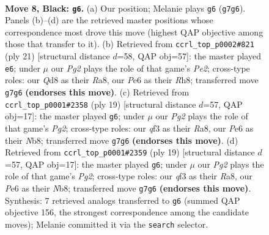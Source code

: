 \documentclass[11pt]{article}
\begin{document}
\begin{figure}[p]\centering
\begin{subfigure}{0.46\textwidth}\centering
\resizebox{\linewidth}{!}{%
\newchessgame
\chessboard[
  setfen={rn1qkb1r/pp3ppp/4pn2/3p4/3P2P1/2N2Q1P/PPP2P2/R1B1KB1R b KQkq - 0 8},
  showmover=false,
  pgfstyle=straightmove, color=movearrow, markmove={g7-g6}
]}
\caption{}
\end{subfigure}\hfill
\begin{subfigure}{0.46\textwidth}\centering
\resizebox{\linewidth}{!}{%
\newchessgame
\chessboard[
  setfen={r3kb1r/ppq1pppp/1np2n2/4N3/3P4/5QP1/PP2PP1P/R1B1KB1R b KQkq - 2 11},
  showmover=false,
  pgfstyle=straightmove, color=movearrow, markmove={e7-e6}
]}
\caption{}
\end{subfigure}
\\[4pt]
\begin{subfigure}{0.46\textwidth}\centering
\resizebox{\linewidth}{!}{%
\newchessgame
\chessboard[
  setfen={rn1qkb1r/1p3pp1/p2p1n2/3Pp2p/8/1N2BP2/PPP3PP/R2QKB1R b KQkq - 0 10},
  showmover=false,
  pgfstyle=straightmove, color=movearrow, markmove={g7-g6}
]}
\caption{}
\end{subfigure}\hfill
\begin{subfigure}{0.46\textwidth}\centering
\resizebox{\linewidth}{!}{%
\newchessgame
\chessboard[
  setfen={rn1qkb1r/1p3pp1/p2p1n2/3Pp2p/8/1N2BP2/PPP3PP/R2QKB1R b KQkq - 0 10},
  showmover=false,
  pgfstyle=straightmove, color=movearrow, markmove={g7-g6}
]}
\caption{}
\end{subfigure}
\caption{\textbf{Move 8, Black: \texttt{g6}.} (a) Our position; Melanie plays \texttt{g6} (\texttt{g7g6}). Panels (b)--(d) are the retrieved master positions whose correspondence most drove this move (highest QAP objective among those that transfer to it). (b) Retrieved from \texttt{ccrl\_top\_p0002\#821} (ply 21) [structural distance $d$=58, QAP obj=57]: the master played \texttt{e6}; under $\mu$ our \emph{Pg2} plays the role of that game's \emph{Pe2}; cross-type roles: our \emph{Q}d8 as their \emph{R}a8, our \emph{P}e6 as their \emph{R}h8; transferred move \texttt{g7g6} \textbf{(endorses this move)}. (c) Retrieved from \texttt{ccrl\_top\_p0001\#2358} (ply 19) [structural distance $d$=57, QAP obj=17]: the master played \texttt{g6}; under $\mu$ our \emph{Pg2} plays the role of that game's \emph{Pg2}; cross-type roles: our \emph{q}f3 as their \emph{R}a8, our \emph{P}e6 as their \emph{N}b8; transferred move \texttt{g7g6} \textbf{(endorses this move)}. (d) Retrieved from \texttt{ccrl\_top\_p0001\#2359} (ply 19) [structural distance $d$=57, QAP obj=17]: the master played \texttt{g6}; under $\mu$ our \emph{Pg2} plays the role of that game's \emph{Pg2}; cross-type roles: our \emph{q}f3 as their \emph{R}a8, our \emph{P}e6 as their \emph{N}b8; transferred move \texttt{g7g6} \textbf{(endorses this move)}. Synthesis: 7 retrieved analogs transferred to \texttt{g6} (summed QAP objective 156, the strongest correspondence among the candidate moves); Melanie committed it via the \texttt{search} selector.}
\label{fig:thought-m15}
\end{figure}
\end{document}
